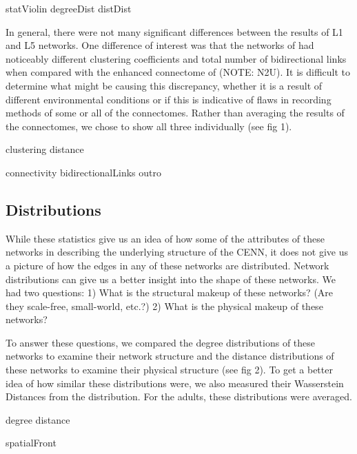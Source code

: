{statViolin}
{degreeDist}
{distDist}

In general, there were not many significant differences between the results of L1 and L5 networks. One difference of interest was that the networks of \cite{Witvliet} had noticeably different clustering coefficients and total number of bidirectional links when compared with the enhanced connectome of \cite{White} (NOTE: N2U).
It is difficult to determine what might be causing this discrepancy, whether it is a result of different environmental conditions or if this is indicative of flaws in recording methods of some or all of the connectomes. Rather than averaging the results of the connectomes, we chose to show all three individually (see fig 1). 

{clustering}
{distance}

{connectivity}
{bidirectionalLinks}
{outro}

\subsection{Distributions}

While these statistics give us an idea of how some of the attributes of these networks in describing the underlying structure of the CENN, it does not give us a picture of how the edges in any of these networks are distributed. 
Network distributions can give us a better insight into the shape of these networks.
We had two questions: 
1) What is the structural makeup of these networks? (Are they scale-free, small-world, etc.?) 
2) What is the physical makeup of these networks?

To answer these questions, we compared the degree distributions of these networks to examine their network structure and the distance distributions of these networks to examine their physical structure (see fig 2). 
To get a better idea of how similar these distributions were, we also measured their Wasserstein Distances from the \ce distribution. 
For the adults, these distributions were averaged.

{degree}
{distance}

{spatialFront}

